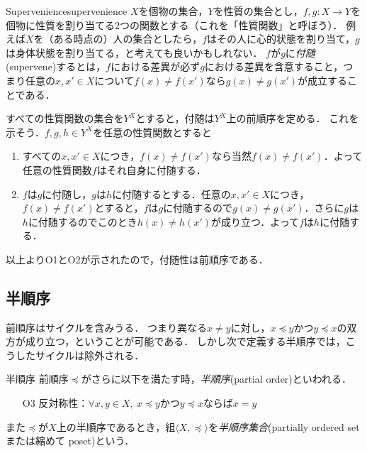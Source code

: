 \documentclass[dvipdfmx,11pt,a4paper]{jsarticle}
\begin{document}
\begin{rei}{Supervenience}{supervenience}
 $X$を個物の集合，$Y$を性質の集合とし，$f, g:X \to Y$を個物に性質を割り当てる2つの関数とする（これを「性質関数」と呼ぼう）．
 例えば$X$を（ある時点の）人の集合としたら，$f$はその人に心的状態を割り当て，$g$は身体状態を割り当てる，と考えても良いかもしれない．
 $f$が$g$に\emph{付随}(supervene)するとは，$f$における差異が必ず$g$における差異を含意すること，つまり任意の$x, x' \in X$について$f(x) \neq f(x')$なら$g(x) \neq g(x')$が成立することである．

 すべての性質関数の集合を$Y^X$とすると，付随は$Y^X$上の前順序を定める．
 これを示そう．$f, g, h \in Y^X$を任意の性質関数とすると
 \begin{enumerate}
  \item すべての$x, x' \in X$につき，$f(x) \neq f(x')$なら当然$f(x) \neq f(x')$．よって任意の性質関数$f$はそれ自身に付随する．
  \item $f$は$g$に付随し，$g$は$h$に付随するとする．任意の$x, x' \in X$につき，$f(x) \neq f(x')$とすると，$f$は$g$に付随するので$g(x) \neq g(x')$．さらに$g$は$h$に付随するのでこのとき$h(x) \neq h(x')$が成り立つ．よって$f$は$h$に付随する．
 \end{enumerate}
以上よりO1とO2が示されたので，付随性は前順序である．
\end{rei}

   
\subsection{半順序}
前順序はサイクルを含みうる．
つまり異なる$x \neq y$に対し，$x \preceq y$かつ$y \preceq x$の双方が成り立つ，ということが可能である．
しかし次で定義する半順序では，こうしたサイクルは除外される．

\begin{dfn}{半順序}{}
前順序$\preceq$がさらに以下を満たす時，\emph{半順序}(partial order)といわれる．
\begin{itemize}
 \item[O3] 反対称性：$\forall x, y \in X, \ x \preceq y$かつ$y \preceq x$ならば$x = y$
\end{itemize}
また$\preceq$が$X$上の半順序であるとき，組$\langle X, \preceq \rangle$を\emph{半順序集合}(partially ordered set または縮めて poset)という．
\end{dfn}
\end{document}
